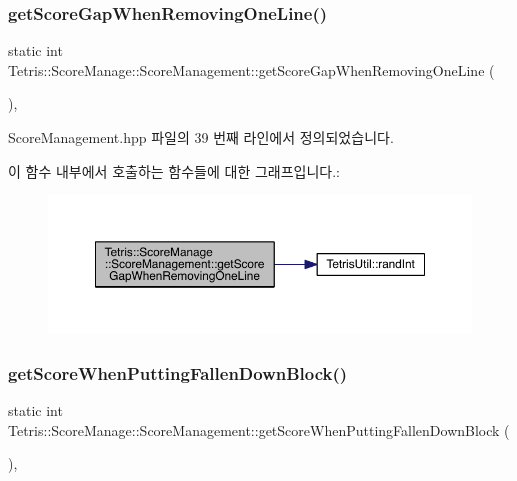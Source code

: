 \subsubsection{\texorpdfstring{get\+Score\+Gap\+When\+Removing\+One\+Line()}{getScoreGapWhenRemovingOneLine()}}
{\footnotesize\ttfamily static int Tetris\+::\+Score\+Manage\+::\+Score\+Management\+::get\+Score\+Gap\+When\+Removing\+One\+Line (\begin{DoxyParamCaption}{ }\end{DoxyParamCaption})\hspace{0.3cm}{\ttfamily [inline]}, {\ttfamily [static]}}



Score\+Management.\+hpp 파일의 39 번째 라인에서 정의되었습니다.

이 함수 내부에서 호출하는 함수들에 대한 그래프입니다.\+:
\nopagebreak
\begin{figure}[H]
\begin{center}
\leavevmode
\includegraphics[width=350pt]{class_tetris_1_1_score_manage_1_1_score_management_a2991c1eb0595da71788aba706e0b27b7_cgraph}
\end{center}
\end{figure}
\mbox{\label{class_tetris_1_1_score_manage_1_1_score_management_a275253fb7c1bb1820ddba3b666b9db09}} 
\subsubsection{\texorpdfstring{get\+Score\+When\+Putting\+Fallen\+Down\+Block()}{getScoreWhenPuttingFallenDownBlock()}}
{\footnotesize\ttfamily static int Tetris\+::\+Score\+Manage\+::\+Score\+Management\+::get\+Score\+When\+Putting\+Fallen\+Down\+Block (\begin{DoxyParamCaption}{ }\end{DoxyParamCaption})\hspace{0.3cm}{\ttfamily [inline]}, {\ttfamily [static]}}



